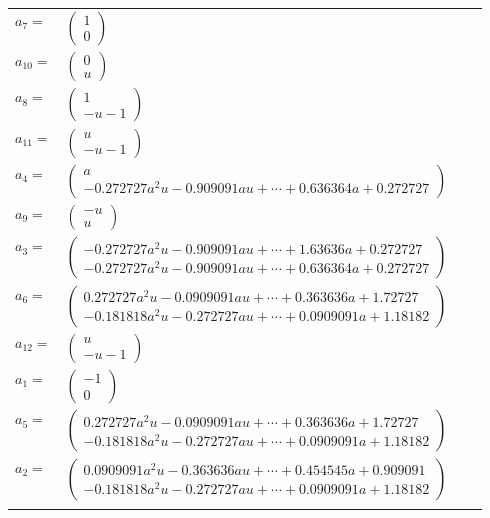 \documentclass[1p]{elsarticle_modified}
\theoremstyle{definition}
\begin{document}
\begin{tabular}{m{7pt} m{180pt} m{7pt} m{180pt} }
\flushright $a_{7}=$&$\begin{pmatrix}1\\0\end{pmatrix}$ \\
\flushright $a_{10}=$&$\begin{pmatrix}0\\u\end{pmatrix}$ \\
\flushright $a_{8}=$&$\begin{pmatrix}1\\- u-1\end{pmatrix}$ \\
\flushright $a_{11}=$&$\begin{pmatrix}u\\- u-1\end{pmatrix}$ \\
\flushright $a_{4}=$&$\begin{pmatrix}a\\-0.272727 a^{2} u-0.909091 a u+\cdots+0.636364 a+0.272727\end{pmatrix}$ \\
\flushright $a_{9}=$&$\begin{pmatrix}- u\\u\end{pmatrix}$ \\
\flushright $a_{3}=$&$\begin{pmatrix}-0.272727 a^{2} u-0.909091 a u+\cdots+1.63636 a+0.272727\\-0.272727 a^{2} u-0.909091 a u+\cdots+0.636364 a+0.272727\end{pmatrix}$ \\
\flushright $a_{6}=$&$\begin{pmatrix}0.272727 a^{2} u-0.0909091 a u+\cdots+0.363636 a+1.72727\\-0.181818 a^{2} u-0.272727 a u+\cdots+0.0909091 a+1.18182\end{pmatrix}$ \\
\flushright $a_{12}=$&$\begin{pmatrix}u\\- u-1\end{pmatrix}$ \\
\flushright $a_{1}=$&$\begin{pmatrix}-1\\0\end{pmatrix}$ \\
\flushright $a_{5}=$&$\begin{pmatrix}0.272727 a^{2} u-0.0909091 a u+\cdots+0.363636 a+1.72727\\-0.181818 a^{2} u-0.272727 a u+\cdots+0.0909091 a+1.18182\end{pmatrix}$ \\
\flushright $a_{2}=$&$\begin{pmatrix}0.0909091 a^{2} u-0.363636 a u+\cdots+0.454545 a+0.909091\\-0.181818 a^{2} u-0.272727 a u+\cdots+0.0909091 a+1.18182\end{pmatrix}$\\&\end{tabular}
\end{document}
